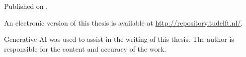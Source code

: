\begin{titlepage}
\begin{center}
        \bigskip
        \bigskip
        Published on \thePublishDate.


        \bigskip
        \bigskip
        An electronic version of this thesis is available at \url{http://repository.tudelft.nl/}.

        \bigskip
        \bigskip
        Generative AI was used to assist in the writing of this thesis. The author is responsible for the content and accuracy of the work.

    \end{center}


\end{titlepage}
